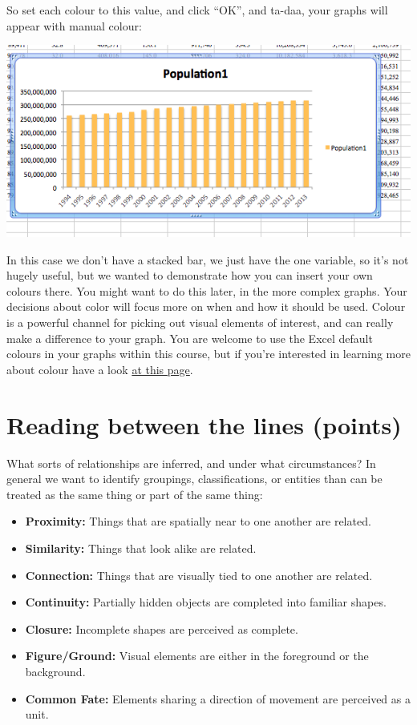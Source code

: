 \documentclass[
]{book}
\providecommand{\tightlist}{%
  \setlength{\itemsep}{0pt}\setlength{\parskip}{0pt}}
\begin{document}
So set each colour to this value, and click ``OK'', and ta-daa, your graphs will appear with manual colour:

\includegraphics{imgs/manual_fill_6.png}

In this case we don't have a stacked bar, we just have the one variable, so it's not hugely useful, but we wanted to demonstrate how you can insert your own colours there. You might want to do this later, in the more complex graphs. Your decisions about color will focus more on when and how it should be used. Colour is a powerful channel for picking out visual elements of interest, and can really make a difference to your graph. You are welcome to use the Excel default colours in your graphs within this course, but if you're interested in learning more about colour have a look \href{https://lisacharlotterost.github.io/2016/04/22/Colors-for-DataVis/}{at this page}.

\hypertarget{reading-between-the-lines-points}{%
\section{Reading between the lines (points)}\label{reading-between-the-lines-points}}

What sorts of relationships are inferred, and under what circumstances? In general we want to identify groupings, classifications, or entities than can be treated as the same thing or part of the same thing:

\begin{itemize}
\tightlist
\item
  \textbf{Proximity:} Things that are spatially near to one another are related.
\item
  \textbf{Similarity:} Things that look alike are related.
\item
  \textbf{Connection:} Things that are visually tied to one another are related.
\item
  \textbf{Continuity:} Partially hidden objects are completed into familiar shapes.
\item
  \textbf{Closure:} Incomplete shapes are perceived as complete.
\item
  \textbf{Figure/Ground:} Visual elements are either in the foreground or the background.
\item
  \textbf{Common Fate:} Elements sharing a direction of movement are perceived as a unit.
\end{itemize}
\end{document}
